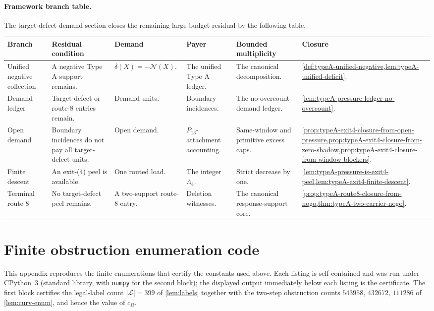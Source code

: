 \documentclass[11pt]{article}
\newcommand{\labels}{\mathcal L}
\newcommand{\No}{\mathcal N}
\newcommand{\FrameworkBranchTableHeader}{%
\toprule
\textbf{Branch} & \textbf{Residual condition} & \textbf{Demand} & \textbf{Payer} & \textbf{Bounded multiplicity} & \textbf{Closure}\\
\midrule
}
\begin{document}
\paragraph{Framework branch table.}
The target-defect demand section closes the remaining large-budget residual
by the following table.
\begin{longtable}{L{0.13\textwidth} L{0.19\textwidth} L{0.14\textwidth} L{0.14\textwidth} L{0.17\textwidth} L{0.17\textwidth}}
\FrameworkBranchTableHeader
Unified negative collection
&
A negative Type A support remains.
&
\(\delta(X)=-\No(X)\).
&
The unified Type A ledger.
&
The canonical decomposition.
&
\cref{def:typeA-unified-negative,lem:typeA-unified-deficit}.
\\
\addlinespace
Demand ledger
&
Target-defect or route-8 entries remain.
&
Demand units.
&
Boundary incidences.
&
The no-overcount demand ledger.
&
\cref{lem:typeA-pressure-ledger-no-overcount}.
\\
\addlinespace
Open demand
&
Boundary incidences do not pay all target-defect units.
&
Open demand.
&
\(P_{13}\)-attachment accounting.
&
Same-window and primitive excess caps.
&
\cref{prop:typeA-exit4-closure-from-open-pressure,prop:typeA-exit4-closure-from-zero-shadow,prop:typeA-exit4-closure-from-window-blockers}.
\\
\addlinespace
Finite descent
&
An exit-\textup{(4)} peel is available.
&
One routed load.
&
The integer \(\Lambda_4\).
&
Strict decrease by one.
&
\cref{lem:typeA-pressure-is-exit4-peel,lem:typeA-exit4-finite-descent}.
\\
\addlinespace
Terminal route 8
&
No target-defect peel remains.
&
A two-support route-8 entry.
&
Deletion witnesses.
&
The canonical response-support core.
&
\cref{prop:typeA-route8-closure-from-nogo,thm:typeA-two-carrier-nogo}.
\\
\bottomrule
\end{longtable}


\appendix

\section{Finite obstruction enumeration code}\label{app:curv-code}

This appendix reproduces the finite enumerations that certify the constants used above.  Each listing is self-contained and was run under CPython~3 (standard library, with \texttt{numpy} for the second block); the displayed output immediately below each listing is the certificate.  The first block certifies the legal-label count $|\labels|=399$ of \cref{lem:labels} together with the two-step obstruction counts $543958,\,432672,\,111286$ of \cref{lem:curv-enum}, and hence the value of $c_\Omega$.
\end{document}
